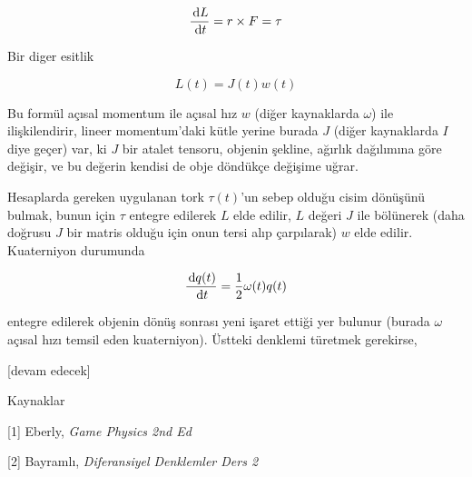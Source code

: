 \documentclass[12pt,fleqn]{article}\usepackage{../../common}
\begin{document}
$$
\frac{\,\mathrm{d} L}{\,\mathrm{d} t} = r \times F = \tau
$$

Bir diger esitlik

$$
L(t) = J(t) w(t)
$$

Bu formül açısal momentum ile açısal hız $w$ (diğer kaynaklarda $\omega$) ile
ilişkilendirir, lineer momentum'daki kütle yerine burada $J$ (diğer kaynaklarda
$I$ diye geçer) var, ki $J$ bir atalet tensoru, objenin şekline, ağırlık
dağılımına göre değişir, ve bu değerin kendisi de obje döndükçe değişime uğrar.

Hesaplarda gereken uygulanan tork $\tau(t)$'un sebep olduğu cisim dönüşünü
bulmak, bunun için $\tau$ entegre edilerek $L$ elde edilir, $L$ değeri $J$ ile
bölünerek (daha doğrusu $J$ bir matris olduğu için onun tersi alıp çarpılarak)
$w$ elde edilir. Kuaterniyon durumunda

$$
\frac{\,\mathrm{d} q(t)}{\,\mathrm{d} t} = \frac{1}{2} \omega(t) q(t)
$$

entegre edilerek objenin dönüş sonrası yeni işaret ettiği yer bulunur (burada
$\omega$ açısal hızı temsil eden kuaterniyon). Üstteki denklemi türetmek
gerekirse,









[devam edecek]

Kaynaklar

[1] Eberly, {\em Game Physics 2nd Ed}

[2] Bayramlı, {\em Diferansiyel Denklemler Ders 2}
\end{document}
